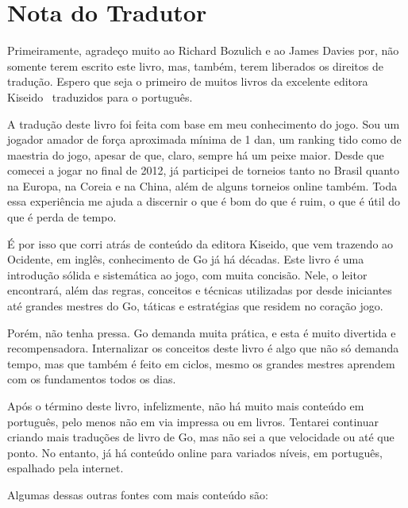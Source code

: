 \chapter{Nota do Tradutor}

Primeiramente, agradeço muito ao Richard Bozulich e ao James Davies por, não somente terem escrito este livro, mas, também, terem liberados os direitos de tradução. Espero que seja o primeiro de muitos livros da excelente editora Kiseido~\cite{kiseido} traduzidos para o português.

\bigskip

A tradução deste livro foi feita com base em meu conhecimento do jogo. Sou um jogador amador de força aproximada mínima de 1 dan, um ranking tido como de maestria do jogo, apesar de que, claro, sempre há um peixe maior. Desde que comecei a jogar no final de 2012, já participei de torneios tanto no Brasil quanto na Europa, na Coreia e na China, além de alguns torneios online também. Toda essa experiência me ajuda a discernir o que é bom do que é ruim, o que é útil do que é perda de tempo.

É por isso que corri atrás de conteúdo da editora Kiseido, que vem trazendo ao Ocidente, em inglês, conhecimento de Go já há décadas. Este livro é uma introdução sólida e sistemática ao jogo, com muita concisão. Nele, o leitor encontrará, além das regras, conceitos e técnicas utilizadas por desde iniciantes até grandes mestres do Go, táticas e estratégias que residem no coração jogo.

Porém, não tenha pressa. Go demanda muita prática, e esta é muito divertida e recompensadora. Internalizar os conceitos deste livro é algo que não só demanda tempo, mas que também é feito em ciclos, mesmo os grandes mestres aprendem com os fundamentos todos os dias.

\pagebreak

Após o término deste livro, infelizmente, não há muito mais conteúdo em português, pelo menos não em via impressa ou em livros. Tentarei continuar criando mais traduções de livro de Go, mas não sei a que velocidade ou até que ponto. No entanto, já há conteúdo online para variados níveis, em português, espalhado pela internet.

Algumas dessas outras fontes com mais conteúdo são:

